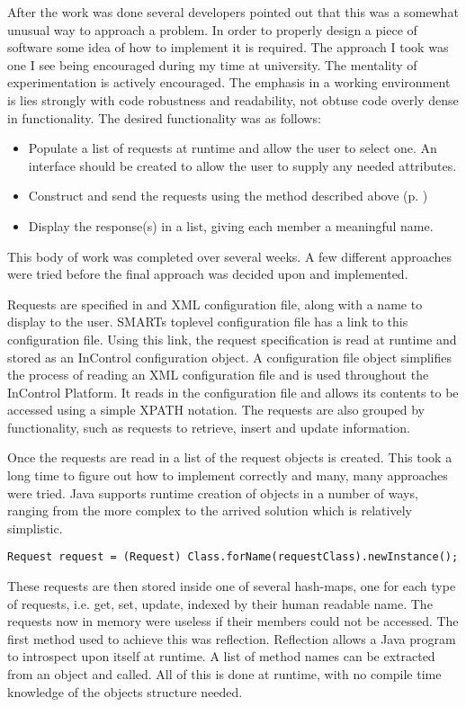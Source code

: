 \documentclass[a4paper, 11pt, titlepage]{article}
\begin{document}
After the work was done several developers pointed out that this was a somewhat unusual way to approach a problem. In order to properly design a piece of software some idea of how to implement it is required. The approach I took was one I see being encouraged during my time at university. The mentality of experimentation is actively encouraged. The emphasis in a working environment is lies strongly with code robustness and readability, not obtuse code overly dense in functionality. 
The desired functionality was as follows: 
\begin{itemize} 
\item Populate a list of requests at runtime and allow the user to select one. An interface should be created to allow the user to supply any needed attributes. 
\item Construct and send the requests using the method described above (p. \pageref{cronos_generic_api}) 
\item Display the response(s) in a list, giving each member a meaningful name. 
\end{itemize} 
This body of work was completed over several weeks. A few different approaches were tried before the final approach was decided upon and implemented. 

Requests are specified in and XML configuration file, along with a name to display to the user. SMARTs toplevel \pageref{toplevel} configuration file has a link to this configuration file. Using this link, the request specification is read at runtime and stored as an InControl configuration object. A configuration file object simplifies the process of reading an XML configuration file and is used throughout the InControl Platform. It reads in the configuration file and allows its contents to be accessed using a simple XPATH notation. The requests are also grouped by functionality, such as requests to retrieve, insert and update information. 

Once the requests are read in a list of the request objects is created. This took a long time to figure out how to implement correctly and many, many approaches were tried. Java supports runtime creation of objects in a number of ways, ranging from the more complex to the arrived solution which is relatively simplistic. \cite{forName}
\label{smart_dynamic_create}
\begin{verbatim} 
Request request = (Request) Class.forName(requestClass).newInstance(); 
\end{verbatim} 
These requests are then stored inside one of several hash-maps, one for each type of requests, i.e. get, set, update, indexed by their human readable name. 
The requests now in memory were useless if their members could not be accessed. The first method used to achieve this was reflection. Reflection allows a Java program to introspect upon itself at runtime. A list of method names can be extracted from an object and called. All of this is done at runtime, with no compile time knowledge of the objects structure needed.\cite{Reflection} 
\end{document}
